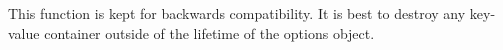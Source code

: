
\begin{DoxyRefList}
\item[Global \mbox{\hyperlink{sc__options_8h_a14960309864b408eacf7923840556e89}{sc\+\_\+options\+\_\+destroy\+\_\+deep}} (sc\+\_\+options\+\_\+t $\ast$opt)]\label{deprecated__deprecated000001}%
%
This function is kept for backwards compatibility. It is best to destroy any key-\/value container outside of the lifetime of the options object. 
\end{DoxyRefList}